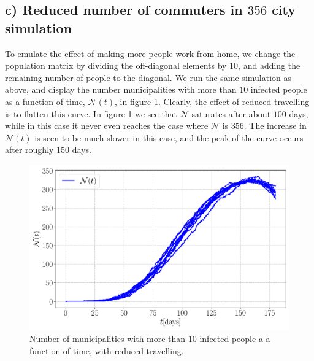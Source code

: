 \subsection{c) Reduced number of commuters in $356$ city simulation}

To emulate the effect of making more people work from home, we change the population matrix by dividing the off-diagonal elements by $10$, and adding the remaining number of people to the diagonal. We run the same simulation as above, and display the number municipalities with more than $10$ infected people as a function of time, $\mathcal{N}(t)$,  in figure \ref{fig:infected_Ec}. Clearly, the effect of reduced travelling is to flatten this curve. In figure \ref{fig:infected_Ec} we see that $\mathcal{N}$ saturates after about $100$ days, while in this case it never even reaches the case where $\mathcal{N}$ is $356$. The increase in $\mathcal{N}(t)$ is seen to be much slower in this case, and the peak of the curve occurs after roughly $150$ days. 


\begin{figure}[htb]
	\centering
	\includegraphics[width=0.9\columnwidth]{../fig/2Ec_N.pdf}
	\caption{Number of municipalities with more than $10$ infected people a a function of time, with reduced travelling.}
	\label{fig:infected_Ec}
\end{figure}
